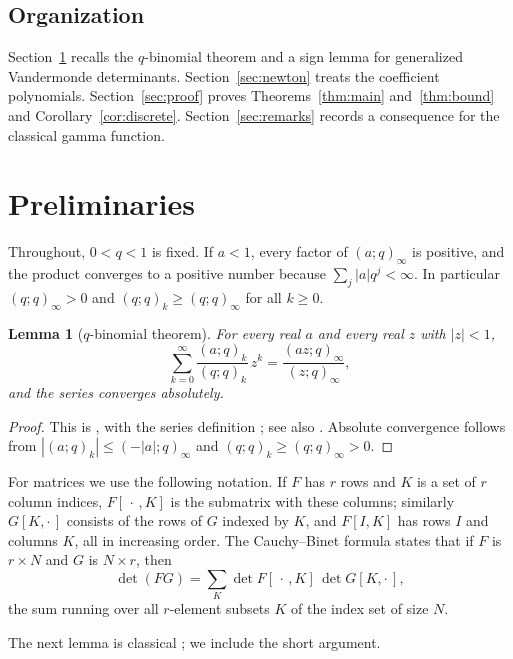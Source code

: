 \documentclass{amsart}
\newtheorem{lemma}[theorem]{Lemma}
\theoremstyle{remark}
\numberwithin{equation}{section}
\begin{document}
\subsection*{Organization}
Section~\ref{sec:prelim} recalls the $q$-binomial theorem and a sign lemma for generalized Vandermonde determinants. Section~\ref{sec:newton} treats the coefficient polynomials. Section~\ref{sec:proof} proves Theorems~\ref{thm:main} and~\ref{thm:bound} and Corollary~\ref{cor:discrete}. Section~\ref{sec:remarks} records a consequence for the classical gamma function.

\section{Preliminaries}\label{sec:prelim}

Throughout, $0<q<1$ is fixed. If $a<1$, every factor of $(a;q)_\infty$ is positive, and the product converges to a positive number because $\sum_j |a|q^j<\infty$. In particular $(q;q)_\infty>0$ and $(q;q)_k\ge(q;q)_\infty$ for all $k\ge0$.

\begin{lemma}[$q$-binomial theorem]\label{lem:qbinom}
For every real $a$ and every real $z$ with $|z|<1$,
\[
\sum_{k=0}^{\infty}\frac{(a;q)_k}{(q;q)_k}\,z^k=\frac{(az;q)_\infty}{(z;q)_\infty},
\]
and the series converges absolutely.
\end{lemma}

\begin{proof}
This is \cite[(17.5.2)]{DLMF}, with the series definition \cite[(17.4.1)]{DLMF}; see also \cite[Section~1.3]{GR}. Absolute convergence follows from $|(a;q)_k|\le(-|a|;q)_\infty$ and $(q;q)_k\ge(q;q)_\infty>0$.
\end{proof}

For matrices we use the following notation. If $F$ has $r$ rows and $K$ is a set of $r$ column indices, $F[\,\cdot\,,K]$ is the submatrix with these columns; similarly $G[K,\cdot\,]$ consists of the rows of $G$ indexed by $K$, and $F[I,K]$ has rows $I$ and columns $K$, all in increasing order. The Cauchy--Binet formula states that if $F$ is $r\times N$ and $G$ is $N\times r$, then
\begin{equation}\label{eq:CB}
\det(FG)=\sum_{K}\det F[\,\cdot\,,K]\,\det G[K,\cdot\,],
\end{equation}
the sum running over all $r$-element subsets $K$ of the index set of size $N$.

The next lemma is classical \cite[Chapter~2]{Karlin}; we include the short argument.
\end{document}
